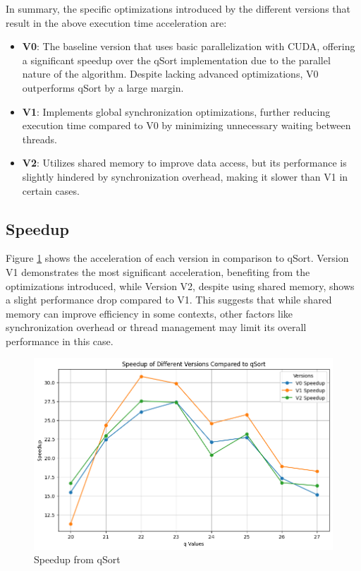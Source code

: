 \documentclass[a4paper,12pt]{article}
\begin{document}
In summary, the specific optimizations introduced by the different versions that result in the above execution time acceleration are:

\begin{itemize}
    \item \textbf{V0}: The baseline version that uses basic parallelization with CUDA, offering a significant speedup over the qSort implementation due to the parallel nature of the algorithm. Despite lacking advanced optimizations, V0 outperforms qSort by a large margin.
    \item \textbf{V1}: Implements global synchronization optimizations, further reducing execution time compared to V0 by minimizing unnecessary waiting between threads.
    \item \textbf{V2}: Utilizes shared memory to improve data access, but its performance is slightly hindered by synchronization overhead, making it slower than V1 in certain cases.
\end{itemize}

\subsection{Speedup}
Figure \ref{fig:speedup} shows the acceleration of each version in comparison to qSort. Version V1 demonstrates the most significant acceleration, benefiting from the optimizations introduced, while Version V2, despite using shared memory, shows a slight performance drop compared to V1. This suggests that while shared memory can improve efficiency in some contexts, other factors like synchronization overhead or thread management may limit its overall performance in this case.

\begin{figure}[H]
    \centering
    \includegraphics[width=0.8\linewidth]{assets/speedup.png}
    \caption{Speedup from qSort}
    \label{fig:speedup}
\end{figure}
\end{document}
